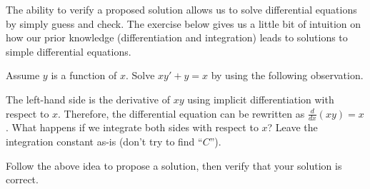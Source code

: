 \documentclass[../main.tex]{subfiles}
\begin{document}
%
%
%
%

The ability to verify a proposed solution allows us to solve differential equations by simply guess and check. The exercise below gives us a little bit of intuition on how our prior knowledge (differentiation and integration) leads to solutions to simple differential equations.
\begin{example}
  Assume \(y\) is a function of \(x\). Solve \(xy' + y = x\) by using the following observation.

  The left-hand side is the derivative of \(xy\) using implicit differentiation with respect to \(x\). Therefore, the differential equation can be rewritten as \(\frac{d}{dx} \left( xy \right) = x\). What happens if we integrate both sides with respect to \(x\)?  Leave the integration constant as-is (don't try to find ``\(C\)'').

  Follow the above idea to propose a solution, then verify that your solution is correct. 

\end{example}
\end{document}

